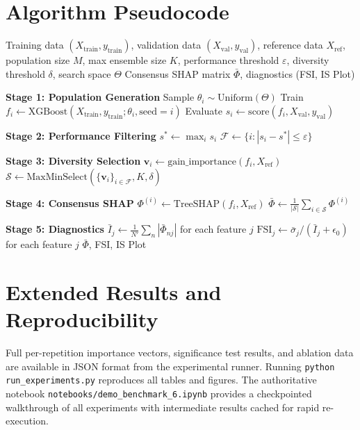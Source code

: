 \documentclass[11pt]{article}
\begin{document}
\section{Algorithm Pseudocode}
\label{app:algorithm}

\begin{algorithm}[htbp]
\caption{DASH Pipeline}
\label{alg:dash}
\begin{algorithmic}[1]
\REQUIRE Training data $(X_{\text{train}}, y_{\text{train}})$, validation
  data $(X_{\text{val}}, y_{\text{val}})$, reference data $X_{\text{ref}}$,
  population size $M$, max ensemble size $K$, performance threshold
  $\varepsilon$, diversity threshold $\delta$, search space $\Theta$
\ENSURE Consensus SHAP matrix $\bar{\Phi}$, diagnostics (FSI, IS Plot)

\STATE \textbf{Stage 1: Population Generation}
  \STATE Sample $\theta_i \sim \text{Uniform}(\Theta)$
  \STATE Train $f_i \gets \text{XGBoost}(X_{\text{train}}, y_{\text{train}};
    \theta_i, \text{seed}=i)$
  \STATE Evaluate $s_i \gets \text{score}(f_i, X_{\text{val}}, y_{\text{val}})$
\ENDFOR

\STATE \textbf{Stage 2: Performance Filtering}
\STATE $s^* \gets \max_i s_i$
\STATE $\mathcal{F} \gets \{i : |s_i - s^*| \leq \varepsilon\}$

\STATE \textbf{Stage 3: Diversity Selection}
  \STATE $\mathbf{v}_i \gets \text{gain\_importance}(f_i, X_{\text{ref}})$
\ENDFOR
\STATE $\mathcal{S} \gets \text{MaxMinSelect}(\{\mathbf{v}_i\}_{i \in \mathcal{F}},
  K, \delta)$

\STATE \textbf{Stage 4: Consensus SHAP}
  \STATE $\Phi^{(i)} \gets \text{TreeSHAP}(f_i, X_{\text{ref}})$
\ENDFOR
\STATE $\bar{\Phi} \gets \frac{1}{|\mathcal{S}|} \sum_{i \in \mathcal{S}}
  \Phi^{(i)}$

\STATE \textbf{Stage 5: Diagnostics}
\STATE $\bar{I}_j \gets \frac{1}{N'}\sum_n |\bar{\Phi}_{nj}|$ for each
  feature $j$
\STATE $\text{FSI}_j \gets \bar{\sigma}_j / (\bar{I}_j + \epsilon_0)$ for
  each feature $j$
\RETURN $\bar{\Phi}$, FSI, IS Plot
\end{algorithmic}
\end{algorithm}

\section{Extended Results and Reproducibility}
\label{app:full_sweep}

Full per-repetition importance vectors, significance test results, and
ablation data are available in JSON format from the experimental runner.
Running \texttt{python run\_experiments.py} reproduces all tables and
figures. The authoritative notebook
\texttt{notebooks/demo\_benchmark\_6.ipynb} provides a checkpointed
walkthrough of all experiments with intermediate results cached for
rapid re-execution.
\end{document}
